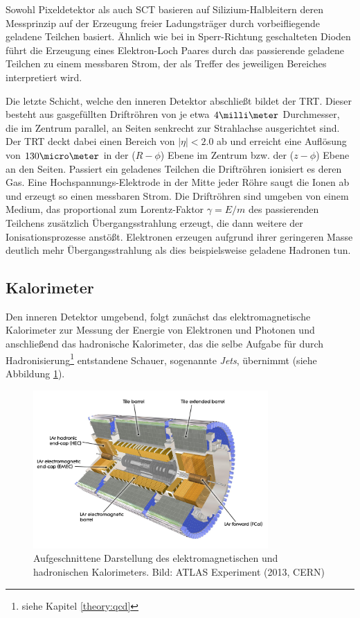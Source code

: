 Sowohl Pixeldetektor als auch \ac{SCT} basieren auf Silizium-Halbleitern deren
Messprinzip auf der Erzeugung freier Ladungsträger durch vorbeifliegende
geladene Teilchen basiert. Ähnlich wie bei in Sperr-Richtung geschalteten
Dioden führt die Erzeugung eines Elektron-Loch Paares durch das passierende
geladene Teilchen zu einem messbaren Strom, der als Treffer des jeweiligen
Bereiches interpretiert wird.

Die letzte Schicht, welche den inneren Detektor abschließt bildet der
\acf{TRT}.  Dieser besteht aus gasgefüllten Driftröhren von je etwa
$4\milli\meter$ Durchmesser, die im Zentrum parallel, an Seiten senkrecht zur
Strahlachse ausgerichtet sind. Der \ac{TRT} deckt dabei einen Bereich von
$|\eta|<2.0$ ab und erreicht eine Auflösung von $130\micro\meter$ in der
($R-\phi$) Ebene im Zentrum bzw. der ($z-\phi$) Ebene an den Seiten. Passiert
ein geladenes Teilchen die Driftröhren ionisiert es deren Gas. Eine
Hochspannungs-Elektrode in der Mitte jeder Röhre saugt die Ionen ab und erzeugt
so einen messbaren Strom. Die Driftröhren sind umgeben von einem Medium, das
proportional zum Lorentz-Faktor $\gamma=E/m$ des passierenden Teilchens
zusätzlich Übergangsstrahlung erzeugt, die dann weitere der Ionisationsprozesse
anstößt. Elektronen erzeugen aufgrund ihrer geringeren Masse deutlich mehr
Übergangsstrahlung als dies beispielsweise geladene Hadronen tun.



\subsection{Kalorimeter}
\label{calorimeter}

Den inneren Detektor umgebend, folgt zunächst das elektromagnetische
Kalorimeter zur Messung der Energie von Elektronen und Photonen und
anschließend das hadronische Kalorimeter, das die selbe Aufgabe für durch
Hadronisierung\footnote{siehe Kapitel \ref{theory:qcd}} entstandene Schauer,
sogenannte \textit{Jets}, übernimmt (siehe Abbildung \ref{fig:calorimeter}).

\begin{figure}
    \centering
    \includegraphics[width=0.8\textwidth]{img/calorimeter}
    \caption[Darstellung der Kalorimeter]
        {Aufgeschnittene Darstellung des elektromagnetischen und hadronischen
        Kalorimeters. Bild: ATLAS Experiment (2013, CERN)}
    \label{fig:calorimeter}
\end{figure}

